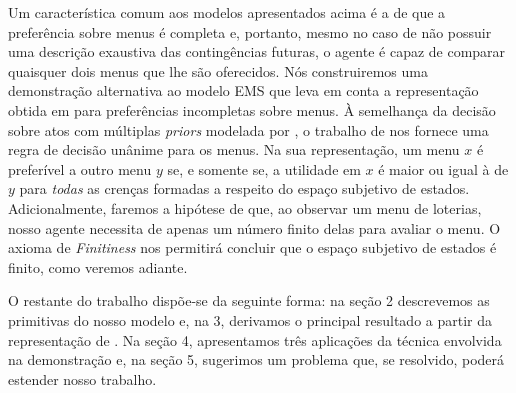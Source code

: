 \documentclass[12pt, a4paper]{article}
\theoremstyle{nonumberplain}
\theoremstyle{plain}
\theoremstyle{plain}
\theoremstyle{plain}
\theoremstyle{nonumberplain}
\begin{document}
Um característica comum aos modelos apresentados acima é a de que a preferência sobre menus é completa e, portanto, mesmo no caso de não possuir uma descrição exaustiva das contingências futuras, o agente é capaz de comparar quaisquer dois menus que lhe são oferecidos. Nós construiremos uma demonstração alternativa ao modelo EMS que leva em conta a representação obtida em \cite{Kochov2007} para preferências incompletas sobre menus. À semelhança da decisão sobre atos com múltiplas \emph{priors} modelada por \cite{Gilboa2010}, o trabalho de \cite{Kochov2007} nos fornece uma regra de decisão unânime para os menus. Na sua representação, um menu $x$ é preferível a outro menu $y$ se, e somente se, a utilidade em $x$ é maior ou igual à de $y$ para \emph{todas} as crenças formadas a respeito do espaço subjetivo de estados. Adicionalmente, faremos a hipótese de que, ao observar um menu de loterias, nosso agente necessita de apenas um número finito delas para avaliar o menu. O axioma de \emph{Finitiness} nos permitirá concluir que o espaço subjetivo de estados é finito, como veremos adiante.

O restante do trabalho dispõe-se da seguinte forma: na seção 2 descrevemos as primitivas do nosso modelo e, na 3, derivamos o principal resultado a partir da representação de \cite{Kochov2007}. Na seção 4, apresentamos três aplicações da técnica envolvida na demonstração e, na seção 5, sugerimos um problema que, se resolvido, poderá estender nosso trabalho.
\clearpage
\end{document}

